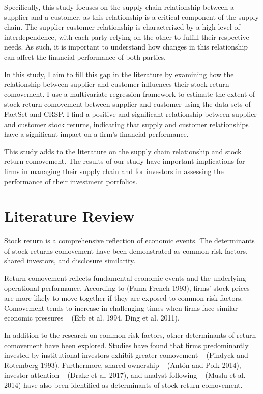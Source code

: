 \documentclass[12pt,english]{article}
\begin{document}
Specifically, this study focuses on the supply chain relationship between a supplier and a customer, as this relationship is a critical component of the supply chain. The supplier-customer relationship is characterized by a high level of interdependence, with each party relying on the other to fulfill their respective needs. As such, it is important to understand how changes in this relationship can affect the financial performance of both parties.

In this study, I aim to fill this gap in the literature by examining how the relationship between supplier and customer influences their stock return comovement. I use a multivariate regression framework to estimate the extent of stock return comovement between supplier and customer using the data sets of FactSet and CRSP. I find a positive and significant relationship between supplier and customer stock returns, indicating that supply and customer relationships have a significant impact on a firm's financial performance. 

This study adds to the literature on the supply chain relationship and stock return comovement. The results of our study have important implications for firms in managing their supply chain and for investors in assessing the performance of their investment portfolios.


\section{Literature Review}\label{sec:litreview}

Stock return is a comprehensive reflection of economic events. The determinants of stock returns comovement have been demonstrated as common risk factors, shared investors, and disclosure similarity.

Return comovement reflects fundamental economic events and the underlying operational performance. According to \cite{fama1993common} (Fama French 1993), firms' stock prices are more likely to move together if they are exposed to common risk factors. Comovement tends to increase in challenging times when firms face similar economic pressures ~\citep {erb1994forecasting} (Erb et al. 1994, Ding et al. 2011).

In addition to the research on common risk factors, other determinants of return comovement have been explored. Studies have found that firms predominantly invested by institutional investors exhibit greater comovement ~\citep{pindyck1993comovement} (Pindyck and Rotemberg 1993). Furthermore, shared ownership ~\citep{anton2014connected} (Antón and Polk 2014), investor attention ~\citep{drake2017comovement} (Drake et al. 2017), and analyst following ~\citep{muslu2014sell} (Muslu et al. 2014) have also been identified as determinants of stock return comovement.
\end{document}
